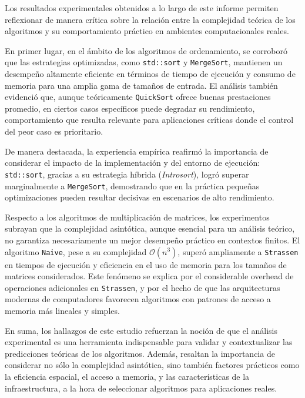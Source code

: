 Los resultados experimentales obtenidos a lo largo de este informe permiten reflexionar de manera crítica sobre la relación entre la complejidad teórica de los algoritmos y su comportamiento práctico en ambientes computacionales reales.

En primer lugar, en el ámbito de los algoritmos de ordenamiento, se corroboró que las estrategias optimizadas, como \texttt{std::sort} y \texttt{MergeSort}, mantienen un desempeño altamente eficiente en términos de tiempo de ejecución y consumo de memoria para una amplia gama de tamaños de entrada. El análisis también evidenció que, aunque teóricamente \texttt{QuickSort} ofrece buenas prestaciones promedio, en ciertos casos específicos puede degradar su rendimiento, comportamiento que resulta relevante para aplicaciones críticas donde el control del peor caso es prioritario.

De manera destacada, la experiencia empírica reafirmó la importancia de considerar el impacto de la implementación y del entorno de ejecución: \texttt{std::sort}, gracias a su estrategia híbrida (\textit{Introsort}), logró superar marginalmente a \texttt{MergeSort}, demostrando que en la práctica pequeñas optimizaciones pueden resultar decisivas en escenarios de alto rendimiento.

Respecto a los algoritmos de multiplicación de matrices, los experimentos subrayan que la complejidad asintótica, aunque esencial para un análisis teórico, no garantiza necesariamente un mejor desempeño práctico en contextos finitos. El algoritmo \texttt{Naive}, pese a su complejidad $\mathcal{O}(n^3)$, superó ampliamente a \texttt{Strassen} en tiempos de ejecución y eficiencia en el uso de memoria para los tamaños de matrices considerados. Este fenómeno se explica por el considerable overhead de operaciones adicionales en \texttt{Strassen}, y por el hecho de que las arquitecturas modernas de computadores favorecen algoritmos con patrones de acceso a memoria más lineales y simples.

En suma, los hallazgos de este estudio refuerzan la noción de que el análisis experimental es una herramienta indispensable para validar y contextualizar las predicciones teóricas de los algoritmos. Además, resaltan la importancia de considerar no sólo la complejidad asintótica, sino también factores prácticos como la eficiencia espacial, el acceso a memoria, y las características de la infraestructura, a la hora de seleccionar algoritmos para aplicaciones reales.
